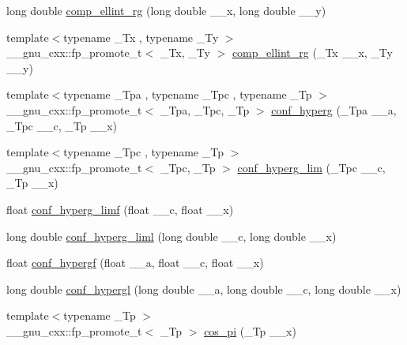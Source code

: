 \begin{DoxyCompactItemize}
\item 
long double \hyperlink{group__mathsf__gnu_gaca5fa8ee8125afc8f35ec6b27806e873}{comp\+\_\+ellint\+\_\+rg} (long double \+\_\+\+\_\+x, long double \+\_\+\+\_\+y)
\item 
{\footnotesize template$<$typename \+\_\+\+Tx , typename \+\_\+\+Ty $>$ }\\\+\_\+\+\_\+gnu\+\_\+cxx\+::fp\+\_\+promote\+\_\+t$<$ \+\_\+\+Tx, \+\_\+\+Ty $>$ \hyperlink{group__mathsf__gnu_ga389b1ef6cad1e33c1120665a4b915642}{comp\+\_\+ellint\+\_\+rg} (\+\_\+\+Tx \+\_\+\+\_\+x, \+\_\+\+Ty \+\_\+\+\_\+y)
\item 
{\footnotesize template$<$typename \+\_\+\+Tpa , typename \+\_\+\+Tpc , typename \+\_\+\+Tp $>$ }\\\+\_\+\+\_\+gnu\+\_\+cxx\+::fp\+\_\+promote\+\_\+t$<$ \+\_\+\+Tpa, \+\_\+\+Tpc, \+\_\+\+Tp $>$ \hyperlink{group__mathsf__gnu_ga4d01e85e7d295afca5d9f8b6c68f19cc}{conf\+\_\+hyperg} (\+\_\+\+Tpa \+\_\+\+\_\+a, \+\_\+\+Tpc \+\_\+\+\_\+c, \+\_\+\+Tp \+\_\+\+\_\+x)
\item 
{\footnotesize template$<$typename \+\_\+\+Tpc , typename \+\_\+\+Tp $>$ }\\\+\_\+\+\_\+gnu\+\_\+cxx\+::fp\+\_\+promote\+\_\+t$<$ \+\_\+\+Tpc, \+\_\+\+Tp $>$ \hyperlink{group__mathsf__gnu_ga9fe7a5e2e741f56d88fd29bc249feab2}{conf\+\_\+hyperg\+\_\+lim} (\+\_\+\+Tpc \+\_\+\+\_\+c, \+\_\+\+Tp \+\_\+\+\_\+x)
\item 
float \hyperlink{group__mathsf__gnu_ga609879a370bc4e9fc70563806bc49cb9}{conf\+\_\+hyperg\+\_\+limf} (float \+\_\+\+\_\+c, float \+\_\+\+\_\+x)
\item 
long double \hyperlink{group__mathsf__gnu_ga367be9b77eb1f9ccc2971d5300da48d1}{conf\+\_\+hyperg\+\_\+liml} (long double \+\_\+\+\_\+c, long double \+\_\+\+\_\+x)
\item 
float \hyperlink{group__mathsf__gnu_gabd18e600aa78c3f2b2f835039506c810}{conf\+\_\+hypergf} (float \+\_\+\+\_\+a, float \+\_\+\+\_\+c, float \+\_\+\+\_\+x)
\item 
long double \hyperlink{group__mathsf__gnu_ga0a9853f30d8fa515a12cd45a92da832e}{conf\+\_\+hypergl} (long double \+\_\+\+\_\+a, long double \+\_\+\+\_\+c, long double \+\_\+\+\_\+x)
\item 
{\footnotesize template$<$typename \+\_\+\+Tp $>$ }\\\+\_\+\+\_\+gnu\+\_\+cxx\+::fp\+\_\+promote\+\_\+t$<$ \+\_\+\+Tp $>$ \hyperlink{group__mathsf__gnu_gafc4698ae591b0e9e61285b0794d43ef4}{cos\+\_\+pi} (\+\_\+\+Tp \+\_\+\+\_\+x)
\item 

\end{DoxyCompactItemize}
